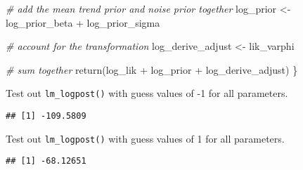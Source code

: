 \documentclass[
]{article}
\newenvironment{Shaded}{\begin{snugshade}}{\end{snugshade}}
\newcommand{\CommentTok}[1]{\textcolor[rgb]{0.56,0.35,0.01}{\textit{#1}}}
\newcommand{\DecValTok}[1]{\textcolor[rgb]{0.00,0.00,0.81}{#1}}
\newcommand{\DocumentationTok}[1]{\textcolor[rgb]{0.56,0.35,0.01}{\textbf{\textit{#1}}}}
\newcommand{\FunctionTok}[1]{\textcolor[rgb]{0.00,0.00,0.00}{#1}}
\newcommand{\NormalTok}[1]{#1}
\newcommand{\OtherTok}[1]{\textcolor[rgb]{0.56,0.35,0.01}{#1}}
\newcommand{\SpecialCharTok}[1]{\textcolor[rgb]{0.00,0.00,0.00}{#1}}
\begin{document}
\begin{Shaded}
\begin{Highlighting}[]
  \CommentTok{\# add the mean trend prior and noise prior together}
\NormalTok{  log\_prior }\OtherTok{\textless{}{-}}\NormalTok{ log\_prior\_beta }\SpecialCharTok{+}\NormalTok{ log\_prior\_sigma}
  
  \CommentTok{\# account for the transformation}
\NormalTok{  log\_derive\_adjust }\OtherTok{\textless{}{-}}\NormalTok{ lik\_varphi}
  
  \CommentTok{\# sum together}
  \FunctionTok{return}\NormalTok{(log\_lik }\SpecialCharTok{+}\NormalTok{ log\_prior }\SpecialCharTok{+}\NormalTok{ log\_derive\_adjust)}
\NormalTok{\}}
\end{Highlighting}
\end{Shaded}

Test out \texttt{lm\_logpost()} with guess values of -1 for all
parameters.

\begin{Shaded}
\end{Shaded}

\begin{verbatim}
## [1] -109.5809
\end{verbatim}

Test out \texttt{lm\_logpost()} with guess values of 1 for all
parameters.

\begin{Shaded}
\end{Shaded}

\begin{verbatim}
## [1] -68.12651
\end{verbatim}
\end{document}
